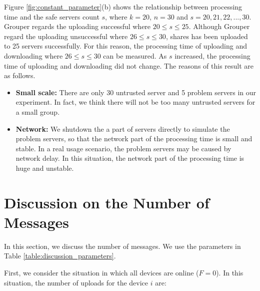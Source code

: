 \documentclass[a4paper,11pt]{report}
\begin{document}
Figure \ref{fig:constant_parameter}(b) shows the relationship between processing time and the safe servers count $s$, where $k = 20$, $n = 30$ and $s = 20, 21, 22, ... , 30$.
Grouper regards the uploading successful where $20 \leq s \leq 25$.
Although Grouper regard the uploading unsuccessful where $26 \leq s \leq 30$, shares has been uploaded to 25 servers successfully.
For this reason, the processing time of uploading and downloading where $26 \leq s \leq 30$ can be measured.
As $s$ increased, the processing time of uploading and downloading did not change.
The reasons of this result are as follows.

\begin{itemize}
	\setlength{\itemsep}{1pt}
	\setlength{\parskip}{0pt}
	\setlength{\parsep}{0pt}
	\item \textbf{Small scale:}
	There are only 30 untrusted server and 5 problem servers in our experiment.
	In fact, we think there will not be too many untrusted servers for a small group.
	\item \textbf{Network: } 
	We shutdown the a part of servers directly to simulate the problem servers, so that the network part of the processing time is small and stable.
	In a real usage scenario, the problem servers may be caused by network delay.
	In this situation, the network part of the processing time is huge and unstable.
\end{itemize}

\section{Discussion on the Number of Messages} \label{section:discussion}

In this section, we discuss the number of messages. 
We use the parameters in Table \ref{table:discussion_parameters}.

First, we consider the situation in which all devices are online ($F=0$).
In this situation, the number of uploads for the device $i$ are:
\end{document}
